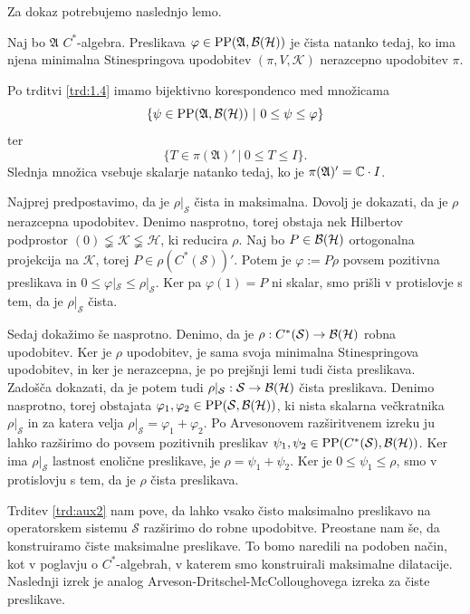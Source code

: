 Za dokaz potrebujemo naslednjo lemo.

\begin{lema}
    Naj bo $\mathfrak{A}$ $C^*$-algebra.
    Preslikava $\varphi \in \operatorname{PP} (\mathfrak{A}, \operatorname{\mathcal{B} (\mathcal{H})})$ je {čista} natanko tedaj, ko ima 
    njena minimalna Stinespringova upodobitev $(\pi, V, \mathcal{K})$ nerazcepno upodobitev $\pi$.
\end{lema}

\begin{dokaz}
    Po trditvi \ref{trd:1.4} imamo bijektivno korespondenco med množicama 
    $$\{\psi \in \operatorname{PP} (\mathfrak{A}, \operatorname{\mathcal{B} (\mathcal{H})})\ |\ 0 \leq \psi \leq \varphi\}$$
    ter $$\{T \in \pi(\mathfrak{A})'\ |\ 0 \leq T \leq I\}.$$
    Slednja množica vsebuje skalarje natanko tedaj, ko je $\pi(\mathfrak{A})' = \mathbb C \cdot I$.
\end{dokaz}

\begin{dokaz}
    Najprej predpostavimo, da je $\rho|_{\mathcal{S}}$ čista in maksimalna.
    Dovolj je dokazati, da je $\rho$ nerazcepna upodobitev.
    Denimo nasprotno, torej obstaja nek Hilbertov podprostor $(0) \lneqq \mathcal{K} \lneqq \mathcal{H}$,
    ki reducira $\rho$. Naj bo $P \in \operatorname{\mathcal{B} (\mathcal{H})}$ ortogonalna projekcija na $\mathcal{K}$, torej $P \in \rho(C^* (\mathcal{S}))'$.
    Potem je $\varphi := P \rho$ povsem pozitivna preslikava in $0 \leq \varphi|_{\mathcal{S}} \leq \rho|_{\mathcal{S}}$.
    Ker pa $\varphi (1) = P$ ni skalar, smo prišli v protislovje s tem, da je $\rho|_{\mathcal{S}}$ čista.

    Sedaj dokažimo še nasprotno. Denimo, da je $\rho: C^*(\mathcal{S}) \to \operatorname{\mathcal{B} (\mathcal{H})}$ robna upodobitev.
    Ker je $\rho$ upodobitev, je sama svoja minimalna Stinespringova upodobitev, in ker je nerazcepna,
    je po prejšnji lemi tudi čista preslikava. Zadošča dokazati, da je potem tudi $\rho|_{\mathcal{S}}: \mathcal{S} \to \operatorname{\mathcal{B} (\mathcal{H})}$
    čista preslikava. Denimo nasprotno, torej obstajata $\varphi_1, \varphi_2 \in \operatorname{PP}(\mathcal{S}, \operatorname{\mathcal{B} (\mathcal{H})})$, ki nista skalarna večkratnika $\rho|_{\mathcal{S}}$
    in za katera velja $\rho|_{\mathcal{S}} = \varphi_1 + \varphi_2$.
    Po Arvesonovem razširitvenem izreku ju lahko razširimo do povsem pozitivnih preslikav $\psi_1, \psi_2 \in \operatorname{PP}(C^*(\mathcal{S}), \operatorname{\mathcal{B} (\mathcal{H})})$.
    Ker ima $\rho|_{\mathcal{S}}$ lastnost enolične preslikave, je $\rho = \psi_1 + \psi_2$.
    Ker je $0 \leq \psi_1 \leq \rho$, smo v protislovju s tem, da je $\rho$ čista preslikava.
\end{dokaz}

Trditev \ref{trd:aux2} nam pove, da lahko vsako čisto maksimalno preslikavo na operatorskem sistemu $\mathcal{S}$ razširimo do robne upodobitve.
Preostane nam še, da konstruiramo čiste maksimalne preslikave. To bomo naredili na podoben način, kot v poglavju o $C^*$-algebrah,
v katerem smo konstruirali maksimalne dilatacije.
Naslednji izrek je analog Arveson-Dritschel-McColloughovega izreka za čiste preslikave.

